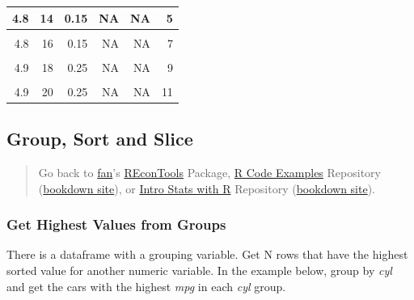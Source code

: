 \documentclass[
]{book}
\begin{document}
\begin{table}[!h]
{\begin{tabular}{r|r|r|r|r|r}
\hline
4.8 & 14 & 0.15 & NA & NA & 5\\
\hline
\cellcolor{gray!6}{4.8} & \cellcolor{gray!6}{15} & \cellcolor{gray!6}{0.15} & \cellcolor{gray!6}{NA} & \cellcolor{gray!6}{NA} & \cellcolor{gray!6}{6}\\
\hline
4.8 & 16 & 0.15 & NA & NA & 7\\
\hline
\cellcolor{gray!6}{4.9} & \cellcolor{gray!6}{17} & \cellcolor{gray!6}{0.25} & \cellcolor{gray!6}{NA} & \cellcolor{gray!6}{NA} & \cellcolor{gray!6}{8}\\
\hline
4.9 & 18 & 0.25 & NA & NA & 9\\
\hline
\cellcolor{gray!6}{4.9} & \cellcolor{gray!6}{19} & \cellcolor{gray!6}{0.25} & \cellcolor{gray!6}{NA} & \cellcolor{gray!6}{NA} & \cellcolor{gray!6}{10}\\
\hline
4.9 & 20 & 0.25 & NA & NA & 11\\
\hline
\end{tabular}}
\end{table}

\hypertarget{group-sort-and-slice}{%
\subsection{Group, Sort and Slice}\label{group-sort-and-slice}}

\begin{quote}
Go back to \href{http://fanwangecon.github.io/}{fan}'s \href{https://fanwangecon.github.io/REconTools/}{REconTools} Package, \href{https://fanwangecon.github.io/R4Econ/}{R Code Examples} Repository (\href{https://fanwangecon.github.io/R4Econ/bookdown}{bookdown site}), or \href{https://fanwangecon.github.io/Stat4Econ/}{Intro Stats with R} Repository (\href{https://fanwangecon.github.io/Stat4Econ/bookdown}{bookdown site}).
\end{quote}

\hypertarget{get-highest-values-from-groups}{%
\subsubsection{Get Highest Values from Groups}\label{get-highest-values-from-groups}}

There is a dataframe with a grouping variable. Get N rows that have the highest sorted value for another numeric variable. In the example below, group by \emph{cyl} and get the cars with the highest \emph{mpg} in each \emph{cyl} group.
\end{document}
